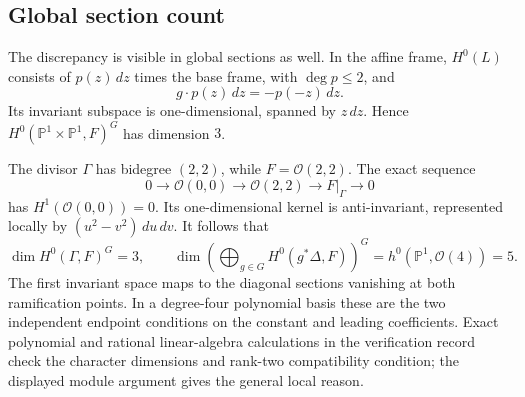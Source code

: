 \documentclass[10pt]{article}
\begin{document}
\subsection*{Global section count}
The discrepancy is visible in global sections as well. In the affine frame, \(H^0(L)\) consists of \(p(z)\,dz\) times the base frame, with \(\deg p\le2\), and \[g\cdot p(z)\,dz=-p(-z)\,dz.\] Its invariant subspace is one-dimensional, spanned by \(z\,dz\). Hence \(H^0(\mathbb P^1\times\mathbb P^1,F)^G\) has dimension \(3\).\par
The divisor \(\Gamma\) has bidegree \((2,2)\), while \(F=\mathcal O(2,2)\). The exact sequence \[0\longrightarrow\mathcal O(0,0)\longrightarrow\mathcal O(2,2)
       \longrightarrow F|_\Gamma\longrightarrow0\] has \(H^1(\mathcal O(0,0))=0\). Its one-dimensional kernel is anti-invariant, represented locally by \((u^2-v^2)\,du\,dv\). It follows that \[\dim H^0(\Gamma,F)^G=3,\qquad
 \dim\left(\bigoplus_{g\in G}H^0(g^*\Delta,F)\right)^G
       =h^0(\mathbb P^1,\mathcal O(4))=5.\] The first invariant space maps to the diagonal sections vanishing at both ramification points. In a degree-four polynomial basis these are the two independent endpoint conditions on the constant and leading coefficients. Exact polynomial and rational linear-algebra calculations in the verification record check the character dimensions and rank-two compatibility condition; the displayed module argument gives the general local reason.\par
\end{document}

